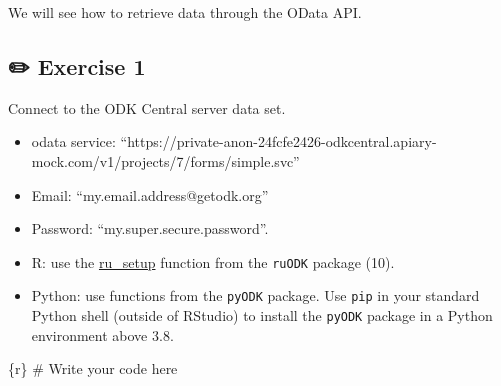 \documentclass[
  letterpaper,
  DIV=11,
  numbers=noendperiod,
  oneside]{scrreprt}
\newenvironment{Shaded}{\begin{snugshade}}{\end{snugshade}}
\newcommand{\CommentTok}[1]{\textcolor[rgb]{0.37,0.37,0.37}{#1}}
\newcommand{\InformationTok}[1]{\textcolor[rgb]{0.37,0.37,0.37}{#1}}
\providecommand{\tightlist}{%
  \setlength{\itemsep}{0pt}\setlength{\parskip}{0pt}}\usepackage{longtable,booktabs,array}
\begin{document}
We will see how to retrieve data through the OData API.

\subsection{\texorpdfstring{{✏️} Exercise 1}{✏️ Exercise 1}}

Connect to the ODK Central server data set.

\begin{itemize}
\tightlist
\item
  odata service:
  ``https://private-anon-24fcfe2426-odkcentral.apiary-mock.com/v1/projects/7/forms/simple.svc''
\item
  Email: ``my.email.address@getodk.org''
\item
  Password: ``my.super.secure.password''.
\end{itemize}

\begin{tcolorbox}[enhanced jigsaw, coltitle=black, opacityback=0, title=\textcolor{quarto-callout-tip-color}{\faLightbulb}\hspace{0.5em}{Tip}, toprule=.15mm, bottomtitle=1mm, colbacktitle=quarto-callout-tip-color!10!white, colframe=quarto-callout-tip-color-frame, left=2mm, opacitybacktitle=0.6, bottomrule=.15mm, arc=.35mm, toptitle=1mm, colback=white, titlerule=0mm, breakable, leftrule=.75mm, rightrule=.15mm]

\begin{itemize}
\tightlist
\item
  R: use the
  \href{https://docs.ropensci.org/ruODK/reference/ru_setup.html}{ru\_setup}
  function from the \texttt{ruODK} package (10).
\item
  Python: use functions from the \texttt{pyODK} package. Use
  \texttt{pip} in your standard Python shell (outside of RStudio) to
  install the \texttt{pyODK} package in a Python environment above 3.8.
\end{itemize}

\end{tcolorbox}

\begin{Shaded}
\begin{Highlighting}[]
\InformationTok{\textasciigrave{}\textasciigrave{}\textasciigrave{}\{r\}}
\CommentTok{\# Write your code here}
\InformationTok{\textasciigrave{}\textasciigrave{}\textasciigrave{}}
\end{Highlighting}
\end{Shaded}
\end{document}
